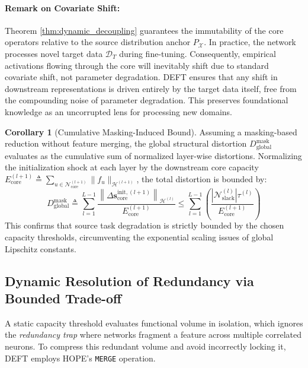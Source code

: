 \documentclass[11pt, a4paper, copyright, gdm]{google}
\newcommand{\norm}[1]{\left\lVert#1\right\rVert}
\newcommand{\sVect}{\boldsymbol{s}}
\newcommand{\calD}{\mathcal{D}}
\newcommand{\calH}{\mathcal{H}}
\newcommand{\calN}{\mathcal{N}}
\newcommand{\calX}{\mathcal{X}}
\theoremstyle{definition}
\newtheorem{corollary}[theorem]{Corollary}
\begin{document}
\paragraph*{Remark on Covariate Shift:}
Theorem \ref{thm:dynamic_decoupling} guarantees the immutability of the core operators relative to the source distribution anchor $P_\calX$. In practice, the network processes novel target data $\calD_T$ during fine-tuning. Consequently, empirical activations flowing through the core will inevitably shift due to standard covariate shift, not parameter degradation. DEFT ensures that any shift in downstream representations is driven entirely by the target data itself, free from the compounding noise of parameter degradation. This preserves foundational knowledge as an uncorrupted lens for processing new domains.

\begin{corollary}[Cumulative Masking-Induced Bound]
\label{cor:mask_bound}
Assuming a masking-based reduction without feature merging, the global structural distortion $D_{\text{global}}^{\text{mask}}$ evaluates as the cumulative sum of normalized layer-wise distortions. Normalizing the initialization shock at each layer by the downstream core capacity $E_{\text{core}}^{(l+1)} \triangleq \sum_{u \in \calN_{\text{core}}^{(l+1)}} \|f_u\|_{\calH^{(l+1)}}$, the total distortion is bounded by:
\begin{equation}
    D_{\text{global}}^{\text{mask}} \triangleq \sum_{l=1}^{L-1} \frac{\norm{\Delta \sVect_{\text{core}}^{\text{init}, (l+1)}}_{\calH^{(l)}}}{E_{\text{core}}^{(l+1)}} \le \sum_{l=1}^{L-1} \left( \frac{|\calN_{\text{slack}}^{(l)}| \tau^{(l)}}{E_{\text{core}}^{(l+1)}} \right)
\end{equation}
This confirms that source task degradation is strictly bounded by the chosen capacity thresholds, circumventing the exponential scaling issues of global Lipschitz constants.
\end{corollary}

\subsection{Dynamic Resolution of Redundancy via Bounded Trade-off}
A static capacity threshold evaluates functional volume in isolation, which ignores the \textit{redundancy trap} where networks fragment a feature across multiple correlated neurons. To compress this redundant volume and avoid incorrectly locking it, DEFT employs HOPE's \texttt{MERGE} operation.
\end{document}
